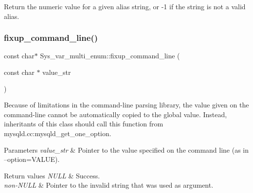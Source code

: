 Return the numeric value for a given alias string, or -\/1 if the string is not a valid alias. \mbox{\label{classSys__var__multi__enum_ac0ae51abfc59daf86aeb51b29fc99164}} 
\subsubsection{\texorpdfstring{fixup\+\_\+command\+\_\+line()}{fixup\_command\_line()}}
{\footnotesize\ttfamily const char$\ast$ Sys\+\_\+var\+\_\+multi\+\_\+enum\+::fixup\+\_\+command\+\_\+line (\begin{DoxyParamCaption}\item[{const char $\ast$}]{value\+\_\+str }\end{DoxyParamCaption})\hspace{0.3cm}{\ttfamily [inline]}}

Because of limitations in the command-\/line parsing library, the value given on the command-\/line cannot be automatically copied to the global value. Instead, inheritants of this class should call this function from mysqld.\+cc\+:mysqld\+\_\+get\+\_\+one\+\_\+option.


\begin{DoxyParams}{Parameters}
{\em value\+\_\+str} & Pointer to the value specified on the command line (as in --option=V\+A\+L\+UE).\\
\hline
\end{DoxyParams}

\begin{DoxyRetVals}{Return values}
{\em N\+U\+LL} & Success.\\
\hline
{\em non-\/\+N\+U\+LL} & Pointer to the invalid string that was used as argument. \\
\hline
\end{DoxyRetVals}
\mbox{\label{classSys__var__multi__enum_ab563d457fe100f28b325665858d41253}} 

